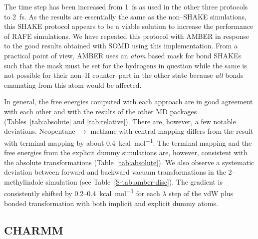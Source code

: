\documentclass[journal=jctcce,manuscript=article]{achemso}
\begin{document}
The time step has been increased from \SI{1}{fs} as used in the other 
three protocols to \SI{2}{fs}.  As the results are essentially the same as the 
non--SHAKE simulations, this SHAKE protocol appears to be a viable solution to 
increase the performance of RAFE simulations.  We have repeated this protocol 
with AMBER in response to the good results obtained with SOMD using this 
implementation.  From a practical point of view, AMBER uses an \emph{atom} 
based mask for bond SHAKEs such that the mask must be set for the hydrogens in 
question while the same is not possible for their non--H counter--part in the 
other state because \emph{all} bonds emanating from this atom would be affected.

In general, the free energies computed with each approach are in good agreement 
with each other and with the results of the other MD packages 
(Tables~\ref{tab:absolute} and \ref{tab:relative}).  There are, however, a few 
notable deviations.  Neopentane $\rightarrow$ methane with central mapping 
differs from the result with terminal mapping by about 
\SI{0.4}{kcal.mol^{-1}}.  The terminal mapping and the free energies from the 
explicit dummy simulations are, however, consistent with the absolute 
transformations (Table~\ref{tab:absolute}).  We also observe a systematic 
deviation between forward and backward vacuum transformations in the 
2--methylindole simulation (see Table~\ref{S-tab:amber-disc}).  The gradient 
is consistently shifted by 0.2--\SI{0.4}{kcal.mol^{-1}} for each $\lambda$ step 
of the vdW plus bonded transformation with both implicit and explicit dummy 
atoms.


\subsection{CHARMM}
\label{sec:charmm-results}
\end{document}
